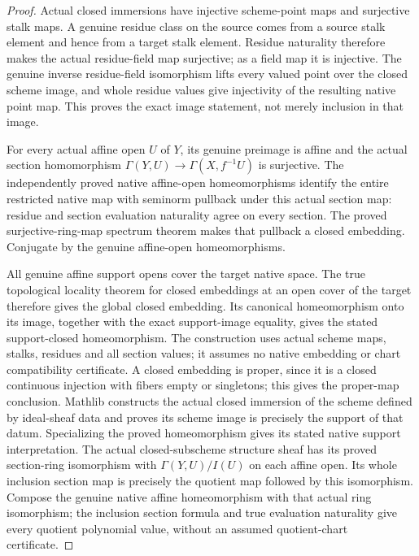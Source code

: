 \begin{proof}
Actual closed immersions have injective scheme-point maps and surjective
stalk maps. A genuine residue class on the source comes from a source
stalk element and hence from a target stalk element. Residue naturality
therefore makes the actual residue-field map surjective; as a field map
it is injective. The genuine inverse residue-field isomorphism lifts
every valued point over the closed scheme image, and whole residue
values give injectivity of the resulting native point map. This proves
the exact image statement, not merely inclusion in that image.

For every actual affine open $U$ of $Y$, its genuine preimage is affine
and the actual section homomorphism
$\Gamma(Y,U)\to\Gamma(X,f^{-1}U)$ is surjective. The independently proved
native affine-open homeomorphisms identify the entire restricted native
map with seminorm pullback under this actual section map: residue and
section evaluation naturality agree on every section. The proved
surjective-ring-map spectrum theorem makes that pullback a closed
embedding. Conjugate by the genuine affine-open homeomorphisms.

All genuine affine support opens cover the target native space. The true
topological locality theorem for closed embeddings at an open cover of
the target therefore gives the global closed embedding. Its canonical
homeomorphism onto its image, together with the exact support-image
equality, gives the stated support-closed homeomorphism. The construction
uses actual scheme maps, stalks, residues and all section values; it
assumes no native embedding or chart compatibility certificate. A
closed embedding is proper, since it is a closed continuous injection
with fibers empty or singletons; this gives the proper-map conclusion.
Mathlib constructs the actual closed immersion of the scheme defined
by ideal-sheaf data and proves its scheme image is precisely the support
of that datum. Specializing the proved homeomorphism gives its stated
native support interpretation. The actual closed-subscheme structure
sheaf has its proved section-ring isomorphism with $\Gamma(Y,U)/I(U)$
on each affine open. Its whole inclusion section map is precisely the
quotient map followed by this isomorphism. Compose the genuine native
affine homeomorphism with that actual ring isomorphism; the inclusion
section formula and true evaluation naturality give every quotient
polynomial value, without an assumed quotient-chart certificate.
\end{proof}

